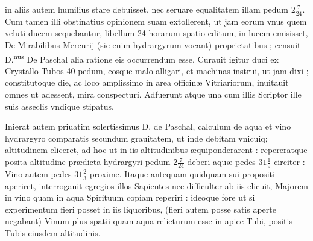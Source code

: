 \documentclass[11pt,a4paper]{article}
\begin{document}

in aliis autem humilius stare debuisset, nec seruare equalitatem illam pedum $2\frac{7}{24}$. Cum tamen illi obstinatius opinionem suam extollerent, ut jam eorum vnus quem  veluti ducem sequebantur, libellum 24 horarum spatio editum, in lucem emisisset, De Mirabilibus Mercurij (sic enim hydrargyrum vocant) proprietatibus ; censuit D.\textsuperscript{nus} De Paschal alia ratione eis occurrendum esse. Curauit igitur duci ex Crystallo Tubos 40 pedum, eosque malo alligari, et machinas instrui, ut jam dixi ; constitutoque die, ac loco amplissimo in area officinæ Vitriariorum, inuitauit omnes ut adessent, mira conspecturi. Adfuerunt atque una cum illis Scriptor ille suis asseclis vndique stipatus.

Inierat autem priuatim solertissimus D. de Paschal, calculum de aqua et vino   hydrargyro comparatis secundum grauitatem, ut inde debitam vnicuiq; altitudinem eliceret, ad hoc ut in iis altitudinibus æquiponderarent : repereratque posita altitudine prædicta hydrargyri pedum $2\frac{7}{24}$ deberi aquæ pedes $31\frac{1}{9}$ circiter : Vino autem pedes $31\frac{2}{3}$ proxime. Itaque antequam quidquam sui propositi aperiret, interrogauit egregios illos Sapientes nec difficulter ab iis elicuit, Majorem in vino quam in aqua Spirituum copiam reperiri : ideoque fore ut si experimentum fieri posset in iis liquoribus, (fieri autem posse satis aperte negabant) Vinum plus spatii quam aqua relicturum esse in apice Tubi, positis Tubis eiusdem altitudinis.
\end{document}
